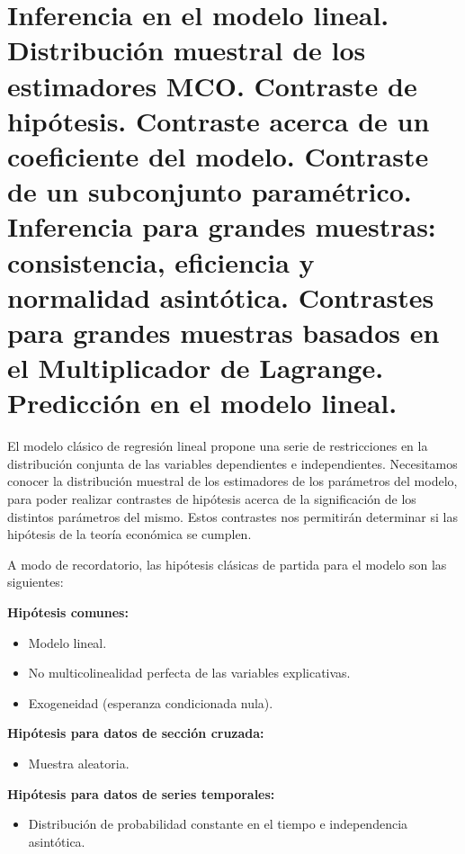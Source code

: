 \chapter[Inferencia en el modelo lineal.]{Inferencia en el modelo lineal. \\ \normalsize Distribuci\'on muestral de los estimadores MCO. Contraste de hip\'otesis. Contraste acerca de un coeficiente del modelo. Contraste de un subconjunto param\'etrico. Inferencia para grandes muestras: consistencia, eficiencia y normalidad asint\'otica. Contrastes para grandes muestras basados en el Multiplicador de Lagrange. Predicci\'on en el modelo lineal.}



El modelo cl\'asico de regresi\'on lineal propone una serie de restricciones en la distribuci\'on conjunta de las variables dependientes e independientes. Necesitamos conocer la distribuci\'on muestral de los estimadores de los par\'ametros del modelo, para poder realizar contrastes de hip\'otesis acerca de la significaci\'on de los distintos par\'ametros del mismo. Estos contrastes nos permitir\'an determinar si las hip\'otesis de la teor\'ia econ\'omica se cumplen.

A modo de recordatorio, las hip\'otesis cl\'asicas de partida para el modelo son las siguientes:

\textbf{Hip\'otesis comunes:}
\begin{itemize}
\item Modelo lineal.
\item No multicolinealidad perfecta de las variables explicativas.
\item Exogeneidad (esperanza condicionada nula).
\end{itemize}

\textbf{Hip\'otesis para datos de secci\'on cruzada:}
\begin{itemize}
\item Muestra aleatoria.
\end{itemize}

\textbf{Hip\'otesis para datos de series temporales:}
\begin{itemize}
\item Distribuci\'on de probabilidad constante en el tiempo e independencia asint\'otica.
\end{itemize}



